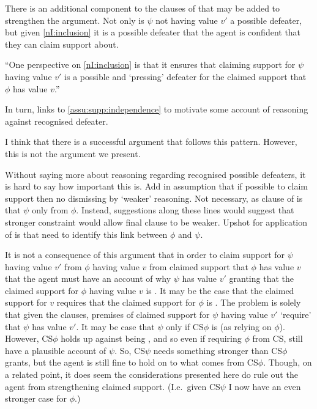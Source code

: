\begin{note}
  There is an additional component to the clauses of \nI{} that may be added to strengthen the argument.
  Not only is \(\psi\) not having value \(v'\) a possible defeater, but given \ref{nI:inclusion} it is a possible defeater that the agent is confident that they can claim support about.

  ``One perspective on \ref{nI:inclusion} is that it ensures that claiming support for \(\psi\) having value \(v'\) is a possible and `pressing' defeater for the claimed support that \(\phi\) has value \(v\).''

  {
    \color{red}
     In turn, links to \autoref{assu:supp:independence} to motivate some account of reasoning against recognised defeater.

  I think that there is a successful argument that follows this pattern.
  However, this is not the argument we present.
  }

  Without saying more about reasoning regarding recognised possible defeaters, it is hard to say how important this is.
  Add in assumption that if possible to claim support then no dismissing by `weaker' reasoning.
  Not necessary, as clause of \nI{} is that \(\psi\) only from \(\phi\).
  Instead, suggestions along these lines would suggest that \nI{} stronger constraint would allow final clause to be weaker.
  Upshot for application of \nI{} is that need to identify this link between \(\phi\) and \(\psi\).
\end{note}


\begin{note}
  It is not a consequence of this argument that in order to claim support for \(\psi\) having value \(v'\) from \(\phi\) having value \(v\) from claimed support that \(\phi\) has value \(v\) that the agent must have an account of why \(\psi\) has value \(v'\) granting that the claimed support for \(\phi\) having value \(v\) is \mom{}.
  It may be the case that the claimed support for \(v\) requires that the claimed support for \(\phi\) is \nmom{}.
  The problem is solely that given the clauses, premises of claimed support for \(\psi\) having value \(v'\) `require' that \(\psi\) has value \(v'\).
  It may be case that \(\psi\) only if CS\(\phi\) is \nmom{} (as relying on \(\phi\)).
  However, CS\(\phi\) holds up against being \mom{}, and so even if requiring \(\phi\) from CS, still have a plausible account of \(\psi\).
  So, CS\(\psi\) needs something stronger than CS\(\phi\) grants, but the agent is still fine to hold on to what comes from CS\(\phi\).
  Though, on a related point, it does seem the considerations presented here do rule out the agent from strengthening claimed support.
  (I.e.\ given CS\(\psi\) I now have an even stronger case for \(\phi\).)
\end{note}

